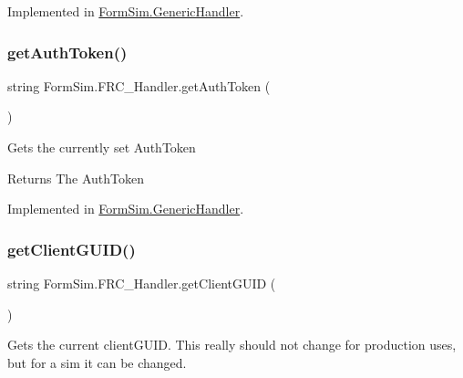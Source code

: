 Implemented in \mbox{\hyperlink{class_form_sim_1_1_generic_handler_a220e1a96282940bc7b2fe8d898aec987}{Form\+Sim.\+Generic\+Handler}}.

\mbox{\label{interface_form_sim_1_1_f_r_c___handler_aeebaee9e36c649daae23db9fc710b261}} 
\subsubsection{\texorpdfstring{get\+Auth\+Token()}{getAuthToken()}}
{\footnotesize\ttfamily string Form\+Sim.\+F\+R\+C\+\_\+\+Handler.\+get\+Auth\+Token (\begin{DoxyParamCaption}{ }\end{DoxyParamCaption})}



Gets the currently set Auth\+Token 

\begin{DoxyReturn}{Returns}
The Auth\+Token
\end{DoxyReturn}


Implemented in \mbox{\hyperlink{class_form_sim_1_1_generic_handler_a4854fdfe77d09a6d2af723d2811099f5}{Form\+Sim.\+Generic\+Handler}}.

\mbox{\label{interface_form_sim_1_1_f_r_c___handler_a66f72d339aebc7c5b434026953a79044}} 
\subsubsection{\texorpdfstring{get\+Client\+G\+U\+I\+D()}{getClientGUID()}}
{\footnotesize\ttfamily string Form\+Sim.\+F\+R\+C\+\_\+\+Handler.\+get\+Client\+G\+U\+ID (\begin{DoxyParamCaption}{ }\end{DoxyParamCaption})}



Gets the current client\+G\+U\+ID. This really should not change for production uses, but for a sim it can be changed. 

